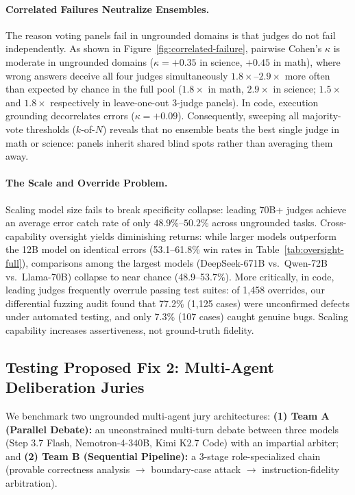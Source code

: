 \paragraph{Correlated Failures Neutralize Ensembles.}
The reason voting panels fail in ungrounded domains is that judges do not fail independently. As shown in Figure~\ref{fig:correlated-failure}, pairwise Cohen's $\kappa$ is moderate in ungrounded domains ($\kappa = +0.35$ in science, $+0.45$ in math), where wrong answers deceive all four judges simultaneously $1.8\times\text{--}2.9\times$ more often than expected by chance in the full pool ($1.8\times$ in math, $2.9\times$ in science; $1.5\times$ and $1.8\times$ respectively in leave-one-out 3-judge panels). In code, execution grounding decorrelates errors ($\kappa = +0.09$). Consequently, sweeping all majority-vote thresholds ($k$-of-$N$) reveals that no ensemble beats the best single judge in math or science: panels inherit shared blind spots rather than averaging them away.

\paragraph{The Scale and Override Problem.}
Scaling model size fails to break specificity collapse: leading 70B+ judges achieve an average error catch rate of only $48.9\%\text{--}50.2\%$ across ungrounded tasks. Cross-capability oversight yields diminishing returns: while larger models outperform the 12B model on identical errors (53.1--61.8\% win rates in Table~\ref{tab:oversight-full}), comparisons among the largest models (DeepSeek-671B vs.\ Qwen-72B vs.\ Llama-70B) collapse to near chance (48.9--53.7\%). More critically, in code, leading judges frequently overrule passing test suites: of 1,458 overrides, our differential fuzzing audit found that 77.2\% (1,125 cases) were unconfirmed defects under automated testing, and only 7.3\% (107 cases) caught genuine bugs. Scaling capability increases assertiveness, not ground-truth fidelity.

\subsection{Testing Proposed Fix 2: Multi-Agent Deliberation Juries}
\label{sec:results-jury}

We benchmark two ungrounded multi-agent jury architectures: \textbf{(1) Team A (Parallel Debate):} an unconstrained multi-turn debate between three models (Step 3.7 Flash, Nemotron-4-340B, Kimi K2.7 Code) with an impartial arbiter; and \textbf{(2) Team B (Sequential Pipeline):} a 3-stage role-specialized chain (provable correctness analysis $\to$ boundary-case attack $\to$ instruction-fidelity arbitration).

